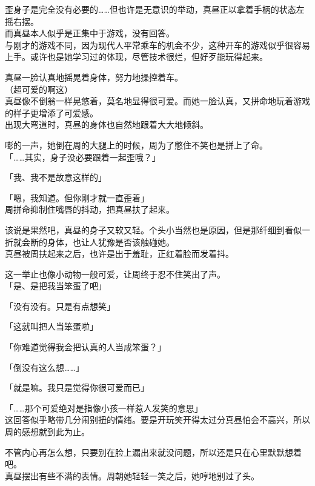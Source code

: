 歪身子是完全没有必要的……但也许是无意识的举动，真昼正以拿着手柄的状态左摇右摆。\\

而真昼本人似乎是正集中于游戏，没有回答。\\

与刚才的游戏不同，因为现代人平常乘车的机会不少，这种开车的游戏似乎很容易上手。或许也是她学习过的体现，尽管技术很烂，但好歹能玩得起来。

真昼一脸认真地摇晃着身体，努力地操控着车。\\

（超可爱的啊这）\\

真昼像不倒翁一样晃悠着，莫名地显得很可爱。而她一脸认真，又拼命地玩着游戏的样子更增添了可爱感。\\

出现大弯道时，真昼的身体也自然地跟着大大地倾斜。

嘭的一声，她倒在周的大腿上的时候，周为了憋住不笑也是拼上了命。\\

「……其实，身子没必要跟着一起歪哦？」

「我、我不是故意这样的」

「嗯，我知道。但你刚才就一直歪着」\\

周拼命抑制住嘴唇的抖动，把真昼扶了起来。

该说是果然吧，真昼的身子又软又轻。个头小当然也是原因，但是那纤细到看似一折就会断的身体，也让人犹豫是否该触碰她。\\

真昼被周扶起来之后，也许是出于羞耻，正红着脸而发着抖。

这一举止也像小动物一般可爱，让周终于忍不住笑出了声。\\

「是、是把我当笨蛋了吧」

「没有没有。只是有点想笑」

「这就叫把人当笨蛋啦」

「你难道觉得我会把认真的人当成笨蛋？」

「倒没有这么想……」

「就是嘛。我只是觉得你很可爱而已」

「……那个可爱绝对是指像小孩一样惹人发笑的意思」\\

这回答似乎略带几分闹别扭的情绪。要是开玩笑开得太过分真昼怕会不高兴，所以周的感想就到此为止。

不管内心再怎么想，只要别在脸上漏出来就没问题，所以还是只在心里默默想着吧。\\

真昼摆出有些不满的表情。周朝她轻轻一笑之后，她哼地别过了头。
